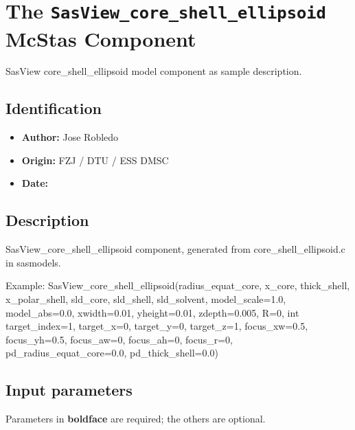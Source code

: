 \section{The \texttt{SasView\_core\_shell\_ellipsoid} McStas Component}
SasView core\_shell\_ellipsoid model component as sample description.

\subsection*{Identification}
\begin{itemize}
  \item \textbf{Author:} Jose Robledo
  \item \textbf{Origin:} FZJ / DTU / ESS DMSC
  \item \textbf{Date:} 
\end{itemize}

\subsection*{Description}
SasView\_core\_shell\_ellipsoid component, generated from core\_shell\_ellipsoid.c in sasmodels.

Example: SasView\_core\_shell\_ellipsoid(radius\_equat\_core, x\_core, thick\_shell, x\_polar\_shell, sld\_core, sld\_shell, sld\_solvent, model\_scale=1.0, model\_abs=0.0, xwidth=0.01, yheight=0.01, zdepth=0.005, R=0, int target\_index=1, target\_x=0, target\_y=0, target\_z=1, focus\_xw=0.5, focus\_yh=0.5, focus\_aw=0, focus\_ah=0, focus\_r=0, pd\_radius\_equat\_core=0.0, pd\_thick\_shell=0.0)

\subsection*{Input parameters}
Parameters in \textbf{boldface} are required; the others are optional.

